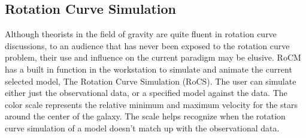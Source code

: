 \documentclass[conference]{IEEEtran-modified}
\providecommand{\e}[1]{\ensuremath{\times 10^{#1}}}
\begin{document}
%


\subsection{Rotation Curve Simulation}

Although theorists in the field of gravity are quite fluent in rotation curve discussions, to an audience that has never been exposed to the rotation curve problem, their use and influence on the current paradigm may be elusive. RoCM has a built in function in the workstation to simulate and animate the current selected model, The Rotation Curve Simulation (RoCS). The user can simulate either just the observational data, or a specified model against the data. The color scale represents the relative {\color[HTML]{EA051C} minimum} and {\color[HTML]{1AAF3A} maximum} velocity for the stars around the center of the galaxy. The scale helps recognize when the rotation curve simulation of a model doesn't match up with the observational data.
\end{document}
